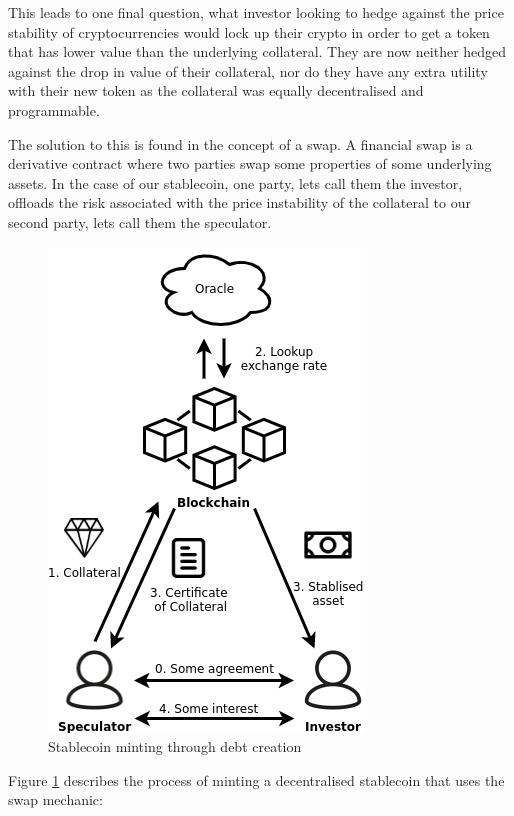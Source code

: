 \documentclass[english,]{IEEEtran}
\begin{document}
This leads to one final question, what investor looking to hedge against
the price stability of cryptocurrencies would lock up their crypto in
order to get a token that has lower value than the underlying
collateral. They are now neither hedged against the drop in value of
their collateral, nor do they have any extra utility with their new
token as the collateral was equally decentralised and programmable.

The solution to this is found in the concept of a swap. A financial swap
is a derivative contract where two parties swap some properties of some
underlying assets. In the case of our stablecoin, one party, lets call
them the investor, offloads the risk associated with the price
instability of the collateral to our second party, lets call them the
speculator.

\begin{figure}
\centering
\includegraphics{img/CDP_create.png}
\caption{Stablecoin minting through debt creation
\label{cdp_destroy_label}}
\end{figure}

Figure \ref{cdp_destroy_label} describes the process of minting a
decentralised stablecoin that uses the swap mechanic:
\end{document}
